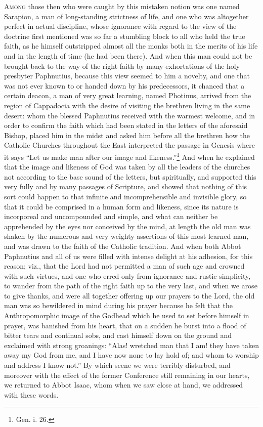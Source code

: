 \textsc{Among} those then who were caught by this mistaken notion was one named Sarapion, a man of long-standing strictness of life, and one who was altogether perfect in actual discipline, whose ignorance with regard to the view of the doctrine first mentioned was so far a stumbling block to all who held the true faith, as he himself outstripped almost all the monks both in the merits of his life and in the length of time (he had been there). And when this man could not be brought back to the way of the right faith by many exhortations of the holy presbyter Paphnutius, because this view seemed to him a novelty, and one that was not ever known to or handed down by his predecessors, it chanced that a certain deacon, a man of very great learning, named Photinus, arrived from the region of Cappadocia with the desire of visiting the brethren living in the same desert: whom the blessed Paphnutius received with the warmest welcome, and in order to confirm the faith which had been stated in the letters of the aforesaid Bishop, placed him in the midst and asked him before all the brethren how the Catholic Churches throughout the East interpreted the passage in Genesis where it says “Let us make man after our image and likeness.”\footnote{Gen. i. 26.} And when he explained that the image and likeness of God was taken by all the leaders of the churches not according to the base sound of the letters, but spiritually, and supported this very fully and by many passages of Scripture, and showed that nothing of this sort could happen to that infinite and incomprehensible and invisible glory, so that it could be comprised in a human form and likeness, since its nature is incorporeal and uncompounded and simple, and what can neither be apprehended by the eyes nor conceived by the mind, at length the old man was shaken by the numerous and very weighty assertions of this most learned man, and was drawn to the faith of the Catholic tradition. And when both Abbot Paphnutius and all of us were filled with intense delight at his adhesion, for this reason; viz., that the Lord had not permitted a man of such age and crowned with such virtues, and one who erred only from ignorance and rustic simplicity, to wander from the path of the right faith up to the very last, and when we arose to give thanks, and were all together offering up our prayers to the Lord, the old man was so bewildered in mind during his prayer because he felt that the Anthropomorphic image of the Godhead which he used to set before himself in prayer, was banished from his heart, that on a sudden he burst into a flood of bitter tears and continual sobs, and cast himself down on the ground and exclaimed with strong groanings: “Alas! wretched man that I am! they have taken away my God from me, and I have now none to lay hold of; and whom to worship and address I know not.” By which scene we were terribly disturbed, and moreover with the effect of the former Conference still remaining in our hearts, we returned to Abbot Isaac, whom when we saw close at hand, we addressed with these words.

